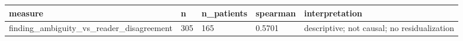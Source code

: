 \begin{tabular}{lllll}
\hline
measure & n & n\_patients & spearman & interpretation \\
\hline
finding\_ambiguity\_vs\_reader\_disagreement & 305 & 165 & 0.5701 & descriptive; not causal; no residualization \\
\hline
\end{tabular}
